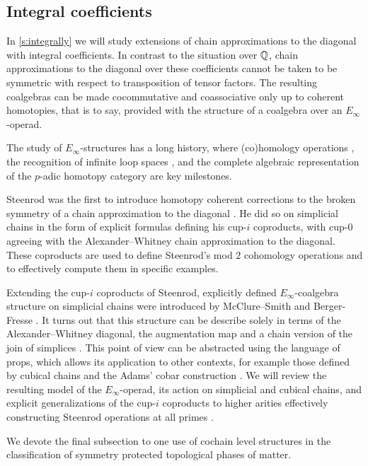 \subsection*{Integral coefficients}

In \cref{s:integrally} we will study extensions of chain approximations to the diagonal with integral coefficients.
In contrast to the situation over $\mathbb{Q}$, chain approximations to the diagonal over these coefficients cannot be taken to be symmetric with respect to transposition of tensor factors.
The resulting coalgebras can be made cocommutative and coassociative only up to coherent homotopies, that is to say, provided with the structure of a coalgebra over an $E_\infty$-operad.

The study of $E_\infty$-structures has a long history, where (co)homology operations \cite{steenrod1962cohomology, may1970general}, the recognition of infinite loop spaces \cite{boardman1973homotopy, may1972geometry}, and the complete algebraic representation of the $p$-adic homotopy category \cite{mandell2001padic} are key milestones.

Steenrod was the first to introduce homotopy coherent corrections to the broken symmetry of a chain approximation to the diagonal \cite{steenrod1947products}.
He did so on simplicial chains in the form of explicit formulas defining his cup-$i$ coproducts, with \mbox{cup-$0$} agreeing with the Alexander--Whitney chain approximation to the diagonal.
These coproducts are used to define Steenrod's mod $2$ cohomology operations and to effectively compute them in specific examples.

Extending the cup-$i$ coproducts of Steenrod, explicitly defined $E_\infty$-coalgebra structure on simplicial chains were introduced by McClure--Smith \cite{mcclure2003multivariable} and Berger\-- Fresse \cite{berger2004combinatorial}.
It turns out that this structure can be describe solely in terms of the Alexander--Whitney diagonal, the augmentation map and a chain version of the join of simplices \cite{medina2020prop1}.
This point of view can be abstracted using the language of props, which allows its application to other contexts, for example those defined by cubical chains \cite{medina2021cubical} and the Adams' cobar construction \cite{medina2021cobar}.
We will review the resulting model of the $E_\infty$-operad, its action on simplicial and cubical chains, and explicit generalizations of the cup-$i$ coproducts to higher arities effectively constructing Steenrod operations at all primes \cite{medina2021may_st}.

We devote the final subsection to one use of cochain level structures in the classification of symmetry protected topological phases of matter.

